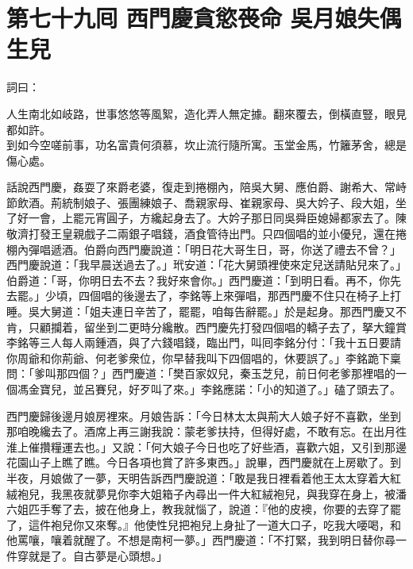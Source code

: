 
\chapter*{第七十九囘 西門慶貪慾䘮命 吳月娘失偶生兒}


詞曰：

\begin{myquote} 
人生南北如岐路，世事悠悠等風絮，造化弄人無定據。翻來覆去，倒橫直豎，眼見都如許。\\
到如今空嗟前事，功名富貴何須慕，坎止流行隨所寓。玉堂金馬，竹籬茅舍，總是傷心處。

\end{myquote} 

話說西門慶，姦耍了來爵老婆，復走到捲棚內，陪吳大舅、應伯爵、謝希大、常峙節飲酒。荊統制娘子、張團練娘子、喬親家母、崔親家母、吳大妗子、段大姐，坐了好一會，上罷元宵圓子，方纔起身去了。大妗子那日同吳舜臣媳婦都家去了。陳敬濟打發王皇親戲子二兩銀子唱錢，酒食管待出門。只四個唱的並小優兒，還在捲棚內彈唱遞酒。伯爵向西門慶說道：「明日花大哥生日，哥，你送了禮去不曾？」西門慶說道：「我早晨送過去了。」玳安道：「花大舅頭裡使來定兒送請貼兒來了。」伯爵道：「哥，你明日去不去？我好來會你。」西門慶道：「到明日看。再不，你先去罷。」少頃，四個唱的後邊去了，李銘等上來彈唱，那西門慶不住只在椅子上打睡。{}吳大舅道：「姐夫連日辛苦了，罷罷，咱每告辭罷。」於是起身。那西門慶又不肯，只顧攔着，留坐到二更時分纔散。西門慶先打發四個唱的轎子去了，拏大鐘賞李銘等三人每人兩鍾酒，與了六錢唱錢，臨出門，叫囘李銘分付：「我十五日要請你周爺和你荊爺、何老爹衆位，你早替我叫下四個唱的，休要誤了。」李銘跪下稟問：「爹叫那四個？」西門慶道：「樊百家奴兒，秦玉芝兒，前日何老爹那裡唱的一個馮金寶兒，{}並呂賽兒，好歹叫了來。」李銘應諾：「小的知道了。」磕了頭去了。

西門慶歸後邊月娘房裡來。月娘告訴：「今日林太太與荊大人娘子好不喜歡，坐到那咱晚纔去了。酒席上再三謝我說：蒙老爹扶持，但得好處，不敢有忘。在出月徃淮上催攢糧運去也。」又說：「何大娘子今日也吃了好些酒，喜歡六姐，又引到那邊花園山子上瞧了瞧。今日各項也賞了許多東西。」說畢，西門慶就在上房歇了。到半夜，月娘做了一夢，{}天明告訴西門慶說道：「敢是我日裡看着他王太太穿着大紅絨袍兒，我黑夜就夢見你李大姐箱子內尋出一件大紅絨袍兒，與我穿在身上，被潘六姐匹手奪了去，披在他身上，教我就惱了，說道：『他的皮襖，你要的去穿了罷了，這件袍兒你又來奪。』{}他使性兒把袍兒上身扯了一道大口子，吃我大喓喝，和他罵嚷，嚷着就醒了。不想是南柯一夢。」西門慶道：「不打緊，我到明日替你尋一件穿就是了。自古夢是心頭想。」

